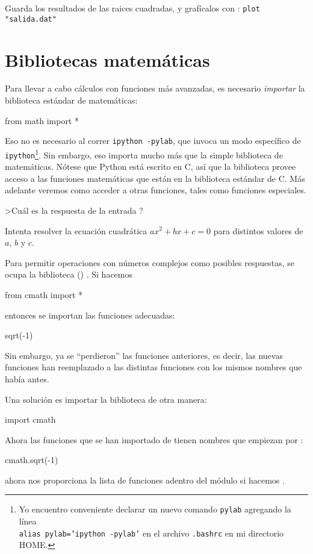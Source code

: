\ej Guarda los resultados de las raices cuadradas, y grafícalos con :
\texttt{plot "salida.dat"}





\section{Bibliotecas matemáticas}
Para llevar a cabo cálculos con funciones más avanzadas, es necesario \emph{importar} la biblioteca estándar de matemáticas:
\begin{python}
from math import *
\end{python}
Eso no es necesario al correr \texttt{ipython -pylab}, que invoca un modo específico de \texttt{ipython}\footnote{Yo encuentro conveniente declarar un nuevo comando \texttt{pylab} agregando la línea \\ \texttt{alias pylab='ipython -pylab'} en el archivo \texttt{.bashrc} en mi directorio HOME.}.
Sin embargo, eso importa mucho más que la simple biblioteca de matemáticas.  Nótese que Python está escrito en C, así que la biblioteca  provee acceso a las funciones matemáticas que están en la biblioteca estándar de C. Más adelante veremos como acceder a otras funciones, tales como funciones especiales.

\ej >Cuál es la respuesta de la entrada ?

\ej Intenta resolver la ecuación cuadrática $a x^2 + b x + c = 0$ para distintos valores de $a$, $b$ y $c$. 



Para permitir operaciones con números complejos como posibles respuestas, se ocupa la biblioteca () .
Si hacemos
\begin{python}
from cmath import *
\end{python}
entonces se importan las funciones adecuadas:
\begin{python}
sqrt(-1)
\end{python}
Sin embargo, ya se ``perdieron'' las funciones anteriores, es decir, las nuevas funciones han reemplazado a las distintas funciones con los mismos nombres que había antes.

Una solución es importar la biblioteca de otra manera:
\begin{python}
import cmath
\end{python}
Ahora las funciones que se han importado de  tienen nombres que empiezan por :
\begin{python}
cmath.sqrt(-1)
\end{python}
 ahora nos proporciona la lista de funciones adentro del módulo si hacemos .






